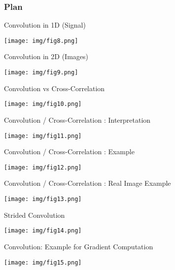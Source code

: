 \documentclass[9pt]{beamer}
\begin{document}
    \begin{frame}
   	 	\frametitle{Plan}
    		\tableofcontents[currentsection]
	\end{frame}

\begin{frame}{Convolution in 1D (Signal)}
\begin{center}
	\texttt{[image: img/fig8.png]} 
\end{center}
\end{frame}

\begin{frame}{Convolution in 2D (Images)}
\begin{center}
	\texttt{[image: img/fig9.png]} 
\end{center}
\end{frame}


\begin{frame}{Convolution vs Cross-Correlation}
\begin{center}
	\texttt{[image: img/fig10.png]} 
\end{center}
\end{frame}

\begin{frame}{Convolution / Cross-Correlation : Interpretation}
\begin{center}
	\texttt{[image: img/fig11.png]} 
\end{center}
\end{frame}

\begin{frame}{Convolution / Cross-Correlation : Example}
\begin{center}
	\texttt{[image: img/fig12.png]} 
\end{center}
\end{frame}

\begin{frame}{Convolution / Cross-Correlation : Real Image Example}
\begin{center}
	\texttt{[image: img/fig13.png]} 
\end{center}
\end{frame}

\begin{frame}{Strided Convolution}
\begin{center}
	\texttt{[image: img/fig14.png]} 
\end{center}
\end{frame}

\begin{frame}{Convolution: Example for Gradient Computation}
\begin{center}
	\texttt{[image: img/fig15.png]} 
\end{center}
\end{frame}
\end{document}
